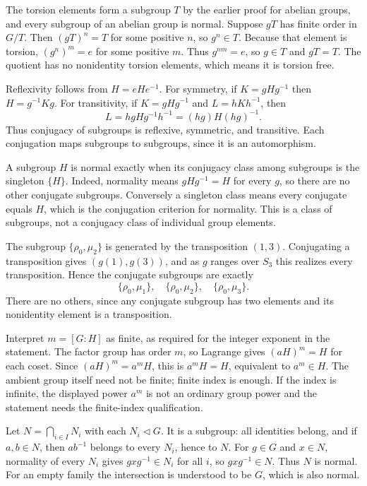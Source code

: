 The torsion elements form a subgroup $T$ by the earlier proof for abelian groups, and every subgroup of an abelian group is normal. Suppose $gT$ has finite order in $G/T$. Then $(gT)^n=T$ for some positive $n$, so $g^n\in T$. Because that element is torsion, $(g^n)^m=e$ for some positive $m$. Thus $g^{nm}=e$, so $g\in T$ and $gT=T$. The quotient has no nonidentity torsion elements, which means it is torsion free.

Reflexivity follows from $H=eHe^{-1}$. For symmetry, if $K=gHg^{-1}$ then $H=g^{-1}Kg$. For transitivity, if $K=gHg^{-1}$ and $L=hKh^{-1}$, then
\[L=hgH g^{-1}h^{-1}=(hg)H(hg)^{-1}.\]
Thus conjugacy of subgroups is reflexive, symmetric, and transitive. Each conjugation maps subgroups to subgroups, since it is an automorphism.

A subgroup $H$ is normal exactly when its conjugacy class among subgroups is the singleton $\{H\}$. Indeed, normality means $gHg^{-1}=H$ for every $g$, so there are no other conjugate subgroups. Conversely a singleton class means every conjugate equals $H$, which is the conjugation criterion for normality. This is a class of subgroups, not a conjugacy class of individual group elements.

The subgroup $\{\rho_0,\mu_2\}$ is generated by the transposition $(1,3)$. Conjugating a transposition gives $(g(1),g(3))$, and as $g$ ranges over $S_3$ this realizes every transposition. Hence the conjugate subgroups are exactly
\[\{\rho_0,\mu_1\},\quad\{\rho_0,\mu_2\},\quad\{\rho_0,\mu_3\}.\]
There are no others, since any conjugate subgroup has two elements and its nonidentity element is a transposition.

Interpret $m=[G:H]$ as finite, as required for the integer exponent in the statement. The factor group has order $m$, so Lagrange gives $(aH)^m=H$ for each coset. Since $(aH)^m=a^mH$, this is $a^mH=H$, equivalent to $a^m\in H$. The ambient group itself need not be finite; finite index is enough. If the index is infinite, the displayed power $a^m$ is not an ordinary group power and the statement needs the finite-index qualification.

Let $N=\bigcap_{i\in I}N_i$ with each $N_i\triangleleft G$. It is a subgroup: all identities belong, and if $a,b\in N$, then $ab^{-1}$ belongs to every $N_i$, hence to $N$. For $g\in G$ and $x\in N$, normality of every $N_i$ gives $gxg^{-1}\in N_i$ for all $i$, so $gxg^{-1}\in N$. Thus $N$ is normal. For an empty family the intersection is understood to be $G$, which is also normal.

